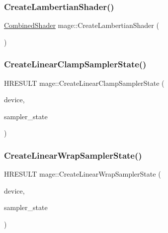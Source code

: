 \subsubsection{\texorpdfstring{Create\+Lambertian\+Shader()}{CreateLambertianShader()}}
{\footnotesize\ttfamily \hyperlink{structmage_1_1_combined_shader}{Combined\+Shader} mage\+::\+Create\+Lambertian\+Shader (\begin{DoxyParamCaption}{ }\end{DoxyParamCaption})}

\hypertarget{namespacemage_aa8f37da8dc3c10b5e4e1cd56be94ff95}{}\label{namespacemage_aa8f37da8dc3c10b5e4e1cd56be94ff95} 
\subsubsection{\texorpdfstring{Create\+Linear\+Clamp\+Sampler\+State()}{CreateLinearClampSamplerState()}}
{\footnotesize\ttfamily H\+R\+E\+S\+U\+LT mage\+::\+Create\+Linear\+Clamp\+Sampler\+State (\begin{DoxyParamCaption}\item[{I\+D3\+D11\+Device2 $\ast$}]{device,  }\item[{I\+D3\+D11\+Sampler\+State $\ast$$\ast$}]{sampler\+\_\+state }\end{DoxyParamCaption})}

\hypertarget{namespacemage_a714981745a2e53e5c55b04c4441bd2d0}{}\label{namespacemage_a714981745a2e53e5c55b04c4441bd2d0} 
\subsubsection{\texorpdfstring{Create\+Linear\+Wrap\+Sampler\+State()}{CreateLinearWrapSamplerState()}}
{\footnotesize\ttfamily H\+R\+E\+S\+U\+LT mage\+::\+Create\+Linear\+Wrap\+Sampler\+State (\begin{DoxyParamCaption}\item[{I\+D3\+D11\+Device2 $\ast$}]{device,  }\item[{I\+D3\+D11\+Sampler\+State $\ast$$\ast$}]{sampler\+\_\+state }\end{DoxyParamCaption})}

